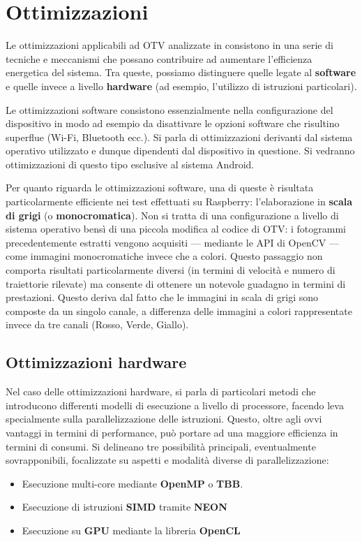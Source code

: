 \section{Ottimizzazioni}

Le ottimizzazioni applicabili ad OTV analizzate in \cite{rs12122047} consistono in una serie di tecniche e meccanismi che
possano contribuire ad aumentare l'efficienza energetica del sistema. %
Tra queste, possiamo distinguere quelle legate al \textbf{software} e quelle invece a livello \textbf{hardware} 
(ad esempio, l'utilizzo di istruzioni particolari).

Le ottimizzazioni software consistono essenzialmente nella configurazione del dispositivo in modo ad esempio
da disattivare le opzioni software che risultino superflue (Wi-Fi, Bluetooth ecc.). Si parla di ottimizzazioni derivanti dal
sistema operativo utilizzato e dunque dipendenti dal dispositivo in questione. Si vedranno ottimizzazioni di questo tipo
esclusive al sistema Android.

Per quanto riguarda le ottimizzazioni software, una di queste è risultata particolarmente efficiente nei test effettuati
su Raspberry: l'elaborazione in \textbf{scala di grigi} (o \textbf{monocromatica})\cite{app11157027}. Non si tratta di una configurazione
a livello di sistema operativo bensì di una piccola modifica al codice di OTV: i fotogrammi precedentemente estratti vengono
acquisiti --- mediante le API di OpenCV --- come immagini monocromatiche invece che a colori. Questo passaggio non comporta 
risultati particolarmente diversi (in termini di velocità e numero di traiettorie rilevate) ma consente di ottenere un 
notevole guadagno in termini di prestazioni. Questo deriva dal fatto che le immagini in scala di grigi
sono composte da un singolo canale, a differenza delle immagini a colori rappresentate invece da tre canali 
(Rosso, Verde, Giallo).

\subsection{Ottimizzazioni hardware}

Nel caso delle ottimizzazioni hardware, si parla di particolari metodi che introducono differenti modelli di esecuzione
a livello di processore, facendo leva specialmente sulla parallelizzazione delle istruzioni. Questo, oltre agli ovvi vantaggi
in termini di performance, può portare ad una maggiore efficienza in termini di consumi.
Si delineano tre possibilità principali, eventualmente sovrapponibili, focalizzate su aspetti e modalità diverse di 
parallelizzazione:
\begin{itemize}
    \item Esecuzione multi-core mediante \textbf{OpenMP} o \textbf{TBB}. 
    \item Esecuzione di istruzioni \textbf{SIMD} tramite \textbf{NEON}
    \item Esecuzione su \textbf{GPU} mediante la libreria \textbf{OpenCL}
\end{itemize}

